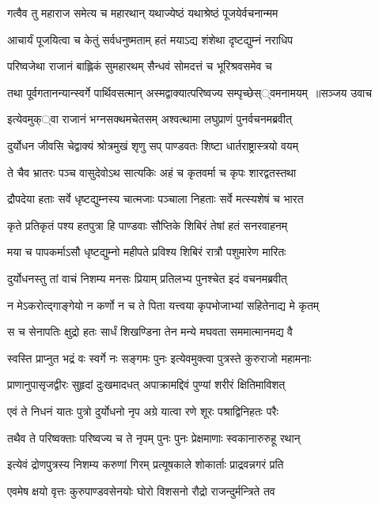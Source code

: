 \twolineshloka
{गत्वैव तु महाराज समेत्य च महारथान्}
{यथाज्येष्ठं यथाश्रेष्ठं पूजयेर्वचनान्मम}


\twolineshloka
{आचार्यं पूजयित्वा च केतुं सर्वधनुष्मताम्}
{हतं मयाऽद्य शंशेथा दृष्टद्युम्नं नराधिप}


\twolineshloka
{परिष्वजेथा राजानं बाह्लिकं सुमहारथम्}
{सैन्धवं सोमदत्तं च भूरिश्रवसमेव च}


\threelineshloka
{तथा पूर्वगतानन्यान्स्वर्गे पार्थिवसत्मान्}
{अस्मद्वाक्यात्परिष्वज्य सम्पृच्छेस््वमनामयम् ॥सञ्जय उवाच}
{}


\twolineshloka
{इत्येवमुक््वा राजानं भग्नसक्थमचेतसम्}
{अश्वत्थामा लघुप्राणं पुनर्वचनमब्रवीत्}


\twolineshloka
{दुर्योधन जीवसि चेद्वाक्यं श्रोत्रमुखं शृणु}
{सप् पाण्डवतः शिष्टा धार्तराष्ट्रास्त्रयो वयम्}


\twolineshloka
{ते चैव भ्रातरः पञ्च वासुदेवोऽथ सात्यकिः}
{अहं च कृतवर्मा च कृपः शारद्वतस्तथा}


\twolineshloka
{द्रौपदेया हताः सर्वे धृष्टद्युम्नस्य चात्मजाः}
{पञ्चाला निहताः सर्वे मत्स्यशेषं च भारत}


\twolineshloka
{कृते प्रतिकृतं पश्य हतपुत्रा हि पाण्डवाः}
{सौप्तिके शिबिरं तेषां हतं सनरवाहनम्}


\twolineshloka
{मया च पापकर्माऽसौ धृष्टद्युम्नो महीपते}
{प्रविश्य शिबिरं रात्रौ पशुमारेण मारितः}


\twolineshloka
{दुर्योधनस्तु तां वाचं निशम्य मनसः प्रियाम्}
{प्रतिलभ्य पुनश्चेत इदं वचनमब्रवीत्}


\twolineshloka
{न मेऽकरोत्द्गाङ्गेयो न कर्णो न च ते पिता}
{यत्त्वया कृपभोजाभ्यां सहितेनाद्य मे कृतम्}


\twolineshloka
{स च सेनापतिः क्षुद्रो हतः सार्धं शिखण्डिना}
{तेन मन्ये मघवता सममात्मानमद्य वै}


\twolineshloka
{स्वस्ति प्राप्नुत भद्रं वः स्वर्गे नः सङ्गमः पुनः}
{इत्येवमुक्त्वा पुत्रस्ते कुरुराजो महामनाः}


\twolineshloka
{प्राणानुपासृजद्वीरः सुहृदां दुःखमादधत्}
{अपाक्रामद्दिवं पुण्यां शरीरं क्षितिमाविशत्}


\twolineshloka
{एवं ते निधनं यातः पुत्रो दुर्योधनो नृप}
{अग्रे यात्वा रणे शूरः पश्राद्विनिहतः परैः}


\twolineshloka
{तथैव ते परिष्वक्ताः परिष्वज्य च ते नृपम्}
{पुनः पुनः प्रेक्षमाणाः स्वकानारुरुहू रथान्}


\twolineshloka
{इत्येवं द्रोणपुत्रस्य निशम्य करुणां गिरम्}
{प्रत्यूषकाले शोकार्ताः प्राद्रवन्नगरं प्रति}


\twolineshloka
{एवमेष क्षयो वृत्तः कुरुपाण्डवसेनयोः}
{घोरो विशसनो रौद्रो राजन्दुर्मन्त्रिते तव}


